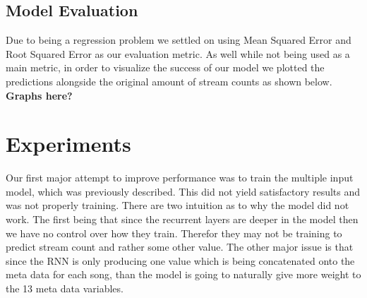 \documentclass[11pt]{article}
\begin{document}
\subsection{Model Evaluation}
Due to being a regression problem we settled on using Mean Squared Error and Root Squared Error as our evaluation metric. As well while not being used as a main metric, in order to visualize the success of our model we plotted the predictions alongside the original amount of stream counts as shown below. \textbf{Graphs here?}



% 
% 
% 
% 
\section{Experiments}
Our first major attempt to improve performance was to train the multiple input model, which was previously described. This did not yield satisfactory results and was not properly training. There are two intuition as to why the model did not work. The first being that since the recurrent layers are deeper in the model then we have no control over how they train. Therefor they may not be training to predict stream count and rather some other value. The other major issue is that since the RNN is only producing one value which is being concatenated onto the meta data for each song, than the model is going to naturally give more weight to the 13 meta data variables. 
\end{document}
